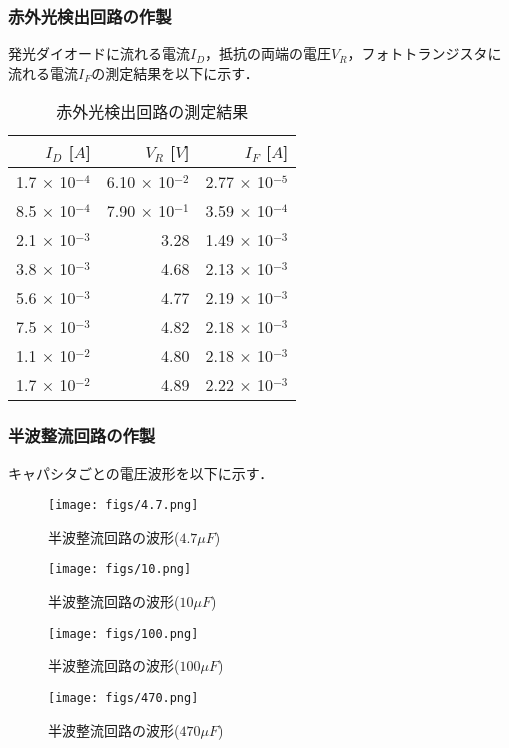 \documentclass{ltjsarticle}
\begin{document}
\subsubsection{赤外光検出回路の作製}
発光ダイオードに流れる電流${I_D}$，抵抗の両端の電圧${V_R}$，フォトトランジスタに流れる電流${I_F}$の測定結果を以下に示す．
\begin{table}[H]
  \centering
  \begin{tabular}{|r|r|r|}
    \hline
    ${I_D}$ [${A}$] & ${V_R}$ [${V}$] & ${I_F}$ [${A}$] \\
    \hline
    1.7 ${\times}$ 10${^{-4}}$ & 6.10 ${\times}$ 10${^{-2}}$ & 2.77 ${\times}$ 10${^{-5}}$ \\
    8.5 ${\times}$ 10${^{-4}}$ & 7.90 ${\times}$ 10${^{-1}}$ & 3.59 ${\times}$ 10${^{-4}}$ \\
    2.1 ${\times}$ 10${^{-3}}$ & 3.28 & 1.49 ${\times}$ 10${^{-3}}$ \\
    3.8 ${\times}$ 10${^{-3}}$ & 4.68 & 2.13 ${\times}$ 10${^{-3}}$ \\
    5.6 ${\times}$ 10${^{-3}}$ & 4.77 & 2.19 ${\times}$ 10${^{-3}}$ \\
    7.5 ${\times}$ 10${^{-3}}$ & 4.82 & 2.18 ${\times}$ 10${^{-3}}$ \\
    1.1 ${\times}$ 10${^{-2}}$ & 4.80 & 2.18 ${\times}$ 10${^{-3}}$ \\
    1.7 ${\times}$ 10${^{-2}}$ & 4.89 & 2.22 ${\times}$ 10${^{-3}}$ \\ \hline
  \end{tabular}
  \caption{赤外光検出回路の測定結果}
\end{table}

\subsubsection{半波整流回路の作製}
キャパシタごとの電圧波形を以下に示す．
\begin{figure}[H]
  \centering
  \texttt{[image: figs/4.7.png]}
  \caption{半波整流回路の波形(${4.7 \mu F}$)}
\end{figure}
\begin{figure}[H]
  \centering
  \texttt{[image: figs/10.png]}
  \caption{半波整流回路の波形(${10 \mu F}$)}
\end{figure}
\begin{figure}[H]
  \centering
  \texttt{[image: figs/100.png]}
  \caption{半波整流回路の波形(${100 \mu F}$)}
\end{figure}
\begin{figure}[H]
  \centering
  \texttt{[image: figs/470.png]}
  \caption{半波整流回路の波形(${470 \mu F}$)}
\end{figure}
\end{document}
